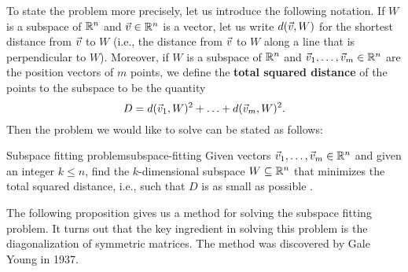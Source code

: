 \documentclass{ximera}
\begin{document}
To state the problem more precisely, let us introduce the following
notation. If $W$ is a subspace of $\mathbb{R}^n$ and $\vec{v}\in\mathbb{R}^n$ is a
vector, let us write $d(\vec{v},W)$ for the shortest distance from
$\vec{v}$ to $W$ (i.e., the distance from $\vec{v}$ to $W$ along a
line that is perpendicular to $W$). Moreover, if $W$ is a subspace of
$\mathbb{R}^n$ and $\vec{v}_1,\ldots,\vec{v}_m\in\mathbb{R}^n$ are the position
vectors of $m$ points, we define the \textbf{total squared distance}%
%
%
%
 of the points to
the subspace to be the quantity
\begin{equation*}
  D = d(\vec{v}_1,W)^2 + \ldots + d(\vec{v}_m,W)^2.
\end{equation*}
Then the problem we would like to solve can be stated as follows:

\begin{problem}{Subspace fitting problem}{subspace-fitting}
  Given vectors $\vec{v}_1,\ldots,\vec{v}_m\in\mathbb{R}^n$ and given an
  integer $k\leq n$, find the $k$-dimensional subspace
  $W\subseteq\mathbb{R}^n$ that minimizes the total squared distance, i.e.,
  such that $D$ is as small as possible%
  .
\end{problem}

The following proposition gives us a method for solving the subspace
fitting problem. It turns out that the key ingredient in solving this
problem is the diagonalization of symmetric matrices. The method was
discovered by Gale Young%
%
 in 1937.
\end{document}
